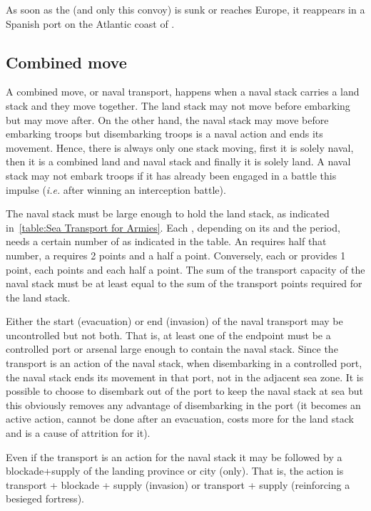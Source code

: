  \label{chMilitary:FlotaDeOroMovement} As soon as the
 (and only this convoy) is sunk or reaches Europe, it
reappears in a Spanish port on the Atlantic coast of \continentAmerica.

\subsection{Combined move}
A combined move, or naval transport, happens when a naval stack carries a land
stack and they move together. The land stack may not move before embarking but
may move after. On the other hand, the naval stack may move before embarking
troops but disembarking troops is a naval action and ends its movement. Hence,
there is always only one stack moving, first it is solely naval, then it is a
combined land and naval stack and finally it is solely land. A naval stack may
not embark troops if it has already been engaged in a battle this impulse
(\emph{i.e.} after winning an interception battle).

The naval stack must be large enough to hold the land stack, as indicated
in~\ref{table:Sea Transport for Armies}. Each \ARMY\Faceplus, depending on its
 and the period, needs a certain number of  as indicated in the table. An \ARMY\Facemoins requires half that
number, a \LD requires 2 points and a \LDE half a point. Conversely, each \NWD
or \NGD provides 1 point, each  points and each \NDE half a point. The
sum of the transport capacity of the naval stack must be at least equal to the
sum of the transport points required for the land stack.


Either the start (evacuation) or end (invasion) of the naval transport may be
uncontrolled but not both. That is, at least one of the endpoint must be a
controlled port or arsenal large enough to contain the naval stack. Since the
transport is an action of the naval stack, when disembarking in a controlled
port, the naval stack ends its movement in that port, not in the adjacent sea
zone. It is possible to choose to disembark out of the port to keep the naval
stack at sea but this obviously removes any advantage of disembarking in the
port (it becomes an active action, cannot be done after an evacuation, costs
more \MP for the land stack and is a cause of attrition for it).

Even if the transport is an action for the naval stack it may be followed by a
blockade+supply of the landing province or city (only). That is, the action is
transport + blockade + supply (invasion) or transport + supply (reinforcing a
besieged fortress).

